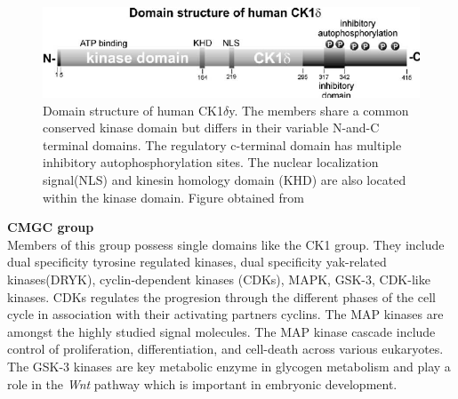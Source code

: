 \documentclass[a4paper, 11pt]{article}
\begin{document}
\begin{figure}[H]
	\includegraphics[width=.8\linewidth]{figures/ck.jpg}
	\centering
	\caption{Domain structure of human CK1$\delta$y. The members share a common conserved kinase domain but differs in their variable N-and-C terminal domains. The regulatory c-terminal domain has multiple inhibitory autophosphorylation sites. The nuclear localization signal(NLS) and kinesin homology domain (KHD) are also located within the kinase domain. Figure obtained from \cite{knippschild2005role}}
	\label{camk_kinase}
\end{figure}
\textbf{CMGC group}\\
Members of this group possess single domains like the CK1 group. They include dual specificity tyrosine regulated kinases, dual specificity yak-related kinases(DRYK), cyclin-dependent kinases (CDKs), MAPK, GSK-3, CDK-like kinases. CDKs regulates the progresion through the different phases of the cell cycle in association with their activating partners cyclins. The MAP kinases are amongst the highly studied signal molecules. The MAP kinase cascade include control of proliferation, differentiation, and cell-death across various eukaryotes. The GSK-3 kinases are key metabolic enzyme in glycogen metabolism and play a role in the \textit{Wnt} pathway which is important in embryonic development. \\
\end{document}
